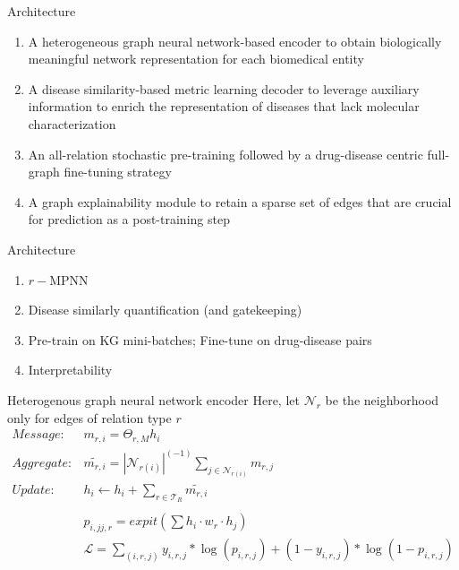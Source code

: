 \documentclass{beamer}
\newcommand{\nhood}{\mathcal{N}}
\newcommand{\nrepresent}{h}
\newcommand{\Loss}{\mathcal{L}}
\newcommand{\relation}{r}
\newcommand{\RelationSet}{\mathcal{T}_R}
\begin{document}
\begin{frame}{Architecture}
    \begin{enumerate}
        \item A heterogeneous graph neural network-based encoder to obtain biologically meaningful network representation for each biomedical entity
        \item A disease similarity-based metric learning decoder to leverage auxiliary information to enrich the representation of diseases that lack molecular characterization
        \item An all-relation stochastic pre-training followed by a drug-disease centric full-graph fine-tuning strategy
        \item A graph explainability module to retain a sparse set of edges that are crucial for prediction as a post-training step
      \end{enumerate}
\end{frame}

\begin{frame}{Architecture}
    \begin{enumerate}
        \item $\relation-$MPNN
        \item Disease similarly quantification (and gatekeeping)
        \item Pre-train on KG mini-batches; Fine-tune on drug-disease pairs 
        \item Interpretability 
      \end{enumerate}
\end{frame}

\begin{frame}{Heterogenous graph neural network encoder}
    Here, let $\nhood_\relation$ be the neighborhood only for edges of relation type $r$
    \begin{align*}
        Message:
        &
        m_{\relation,i} 
        = 
        \Theta_{\relation,M}\nrepresent_i
        \\
        Aggregate:
        &
        \widetilde{m_{\relation,i}} 
        = 
        |\nhood_{\relation (i)}|^{(-1)}
        \sum_{j \in \nhood_{\relation (i)}}
        m_{\relation,j}
        \\
        Update:
        &
        h_i 
        \leftarrow 
        h_i + \sum_{\relation \in \RelationSet}
        \widetilde{m_{\relation,i}} 
        \\
        \\
        &p_{i,jj,r} 
        =
        expit(\sum \nrepresent_i \cdot w_r \cdot \nrepresent_j)
        \\
        &
        \Loss 
        =
        \sum_{(i,r,j)}
        y_{i,r,j} * \log(p_{i,r,j})
        +
        (1-y_{i,r,j}) * \log(1-p_{i,r,j})
    \end{align*}
\end{frame}
\end{document}
